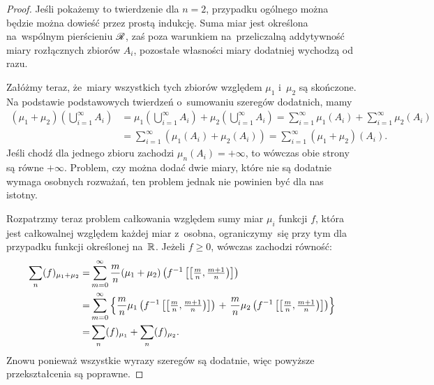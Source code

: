 \documentclass[a4paper,11pt]{article}
\begin{document}
\begin{proof}
  Jeśli pokażemy to twierdzenie dla $n = 2$, przypadku ogólnego można
  będzie można dowieść przez prostą indukcję. Suma miar jest określona
  na~wspólnym pierścieniu $\mathcal{R}$, zaś poza warunkiem na~przeliczalną
  addytywność miary rozłącznych zbiorów $A_{ i }$, pozostałe własności
  miary dodatniej wychodzą od razu.

  Załóżmy teraz, że~miary wszystkich tych zbiorów względem $\mu_{ 1 }$
  i~$\mu_{ 2 }$ są skończone. Na podstawie podstawowych twierdzeń
  o~sumowaniu szeregów dodatnich, mamy
  \begin{equation*}
    \begin{split}
      (\mu_{ 1 } + \mu_{ 2 })\left( \bigcup_{ i = 1 }^{ \infty } A_{ i
        } \right) &= \mu_{ 1 }\left( \bigcup_{ i = 1 }^{ \infty } A_{
          i } \right) + \mu_{ 2 }\left( \bigcup_{ i = 1 }^{ \infty }
        A_{ i } \right) = \sum_{ i = 1 }^{ \infty } \mu_{ 1 }( A_{ i }
      )
      + \sum_{ i = 1 }^{ \infty } \mu_{ 2 }( A_{ i } ) \\
      &= \sum_{ i = 1 }^{ \infty } ( \mu_{ 1 }( A_{ i } ) + \mu_{ 2 }(
      A_{ i } ) ) = \sum_{ i = 1 }^{ \infty } ( \mu_{ 1 } + \mu_{ 2 }
      )( A_{ i } ).
    \end{split}
  \end{equation*}
  Jeśli chodź dla jednego zbioru zachodzi
  $\mu_{ n }( A_{ i } ) = +\infty$, to wówczas obie strony są równe
  $+\infty$. Problem, czy można dodać dwie miary, które nie są
  dodatnie wymaga osobnych rozważań, ten problem jednak nie powinien
  być dla nas istotny.

  Rozpatrzmy teraz problem całkowania względem sumy miar $\mu_{ i }$
  funkcji $f$, która jest całkowalnej względem każdej miar z~osobna,
  ograniczymy~się przy tym dla przypadku funkcji określonej na~$\mathbb{R}$.
  Jeżeli $f \geq 0$, wówczas zachodzi równość:
  \begin{equation}
    \label{eq:RSI2}
    \begin{split}
      \sum_{ n }( f )_{ \mu_{ 1 } + \mu_{ 2 } } =& \sum\limits_{ m = 0 }^{
        \infty } \frac{ m }{ n } ( \mu_{ 1 } + \mu_{ 2 } ) \left( f^{ -1
        }\left[ \left[ \tfrac{ m }{ n }, \tfrac{ m + 1 }{ n } \right)
        \right] \right) \\
      =& \sum\limits_{ m = 0 }^{ \infty } \left\{ \frac{ m }{ n } \mu_{ 1
        }\left( f^{ -1 }\left[ \left[ \tfrac{ m }{ n }, \tfrac{ m + 1 }{ n
              } \right) \right] \right) \right. + \left. \frac{ m }{ n }
        \mu_{ 2 }\left( f^{ -1 }\left[ \left[ \tfrac{ m }{ n },
              \tfrac{ m + 1 }{ n } \right) \right] \right) \right\} \\
      =& \sum\limits_{ n }( f )_{ \mu_{ 1 } } + \sum\limits_{ n }( f )_{ \mu_{ 2 }
      }.
    \end{split}
  \end{equation}
  Znowu ponieważ wszystkie wyrazy szeregów są dodatnie, więc powyższe
  przekształcenia są poprawne.


\end{proof}
\end{document}
